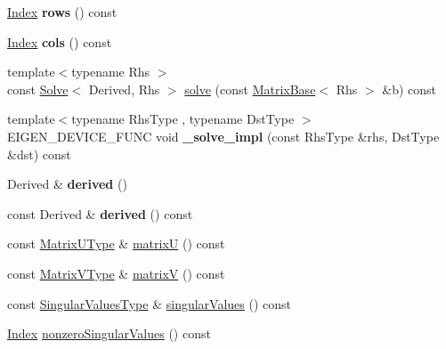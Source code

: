 \begin{DoxyCompactItemize}
\item 
\mbox{\label{group___s_v_d___module_ab1a0d1fcc818a876c3cb2b32887604be}} 
\hyperlink{group___s_v_d___module_a6229a37997eca1072b52cca5ee7a2bec}{Index} {\bfseries rows} () const
\item 
\mbox{\label{group___s_v_d___module_a083d99e05949bab974bbff2966606b7f}} 
\hyperlink{group___s_v_d___module_a6229a37997eca1072b52cca5ee7a2bec}{Index} {\bfseries cols} () const
\item 
{\footnotesize template$<$typename Rhs $>$ }\\const \hyperlink{group___core___module_class_eigen_1_1_solve}{Solve}$<$ Derived, Rhs $>$ \hyperlink{group___s_v_d___module_ab28499936c0764fe5b56b9f4de701e26}{solve} (const \hyperlink{group___core___module_class_eigen_1_1_matrix_base}{Matrix\+Base}$<$ Rhs $>$ \&b) const
\item 
\mbox{\label{group___s_v_d___module_abf33b0dd55b31392ef321d491bf4fc27}} 
{\footnotesize template$<$typename Rhs\+Type , typename Dst\+Type $>$ }\\E\+I\+G\+E\+N\+\_\+\+D\+E\+V\+I\+C\+E\+\_\+\+F\+U\+NC void {\bfseries \+\_\+solve\+\_\+impl} (const Rhs\+Type \&rhs, Dst\+Type \&dst) const
\item 
\mbox{\label{group___s_v_d___module_ab6cdcd4fb99772cf36e7fe2dac0bd847}} 
Derived \& {\bfseries derived} ()
\item 
\mbox{\label{group___s_v_d___module_ae888cfb7f9faf8bbd12ee943c8cbf2b2}} 
const Derived \& {\bfseries derived} () const
\item 
const \hyperlink{group___core___module}{Matrix\+U\+Type} \& \hyperlink{group___s_v_d___module_afc7fe1546b0f6e1801b86f22f5664cb8}{matrixU} () const
\item 
const \hyperlink{group___core___module}{Matrix\+V\+Type} \& \hyperlink{group___s_v_d___module_a245a453b5e7347f737295c23133238c4}{matrixV} () const
\item 
const \hyperlink{class_eigen_1_1internal_1_1_tensor_lazy_evaluator_writable}{Singular\+Values\+Type} \& \hyperlink{group___s_v_d___module_a4e7bac123570c348f7ed6be909e1e474}{singular\+Values} () const
\item 
\hyperlink{group___s_v_d___module_a6229a37997eca1072b52cca5ee7a2bec}{Index} \hyperlink{group___s_v_d___module_afe8a555f38393a319a71ec0f0331c9ef}{nonzero\+Singular\+Values} () const

\end{DoxyCompactItemize}
